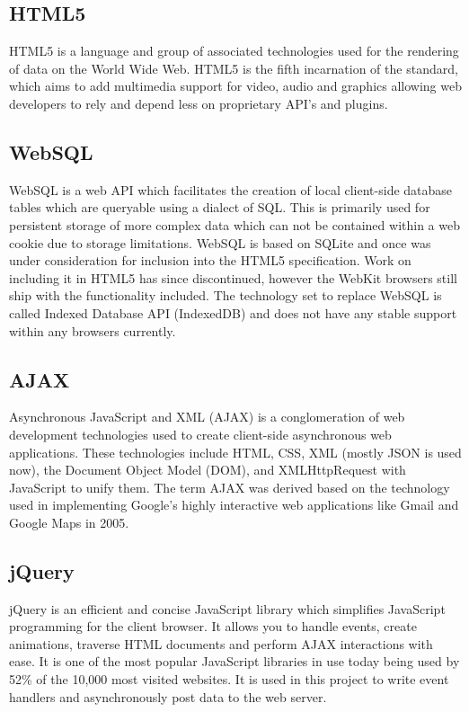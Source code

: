 \documentclass[12pt]{report}	%
\theoremstyle{definition}
\theoremstyle{remark}
\begin{document}
\subsection{HTML5}

HTML5 is a language and group of associated technologies used for the
rendering of data on the World Wide Web. HTML5 is the fifth incarnation
of the standard, which aims to add multimedia support for video, audio
and graphics allowing web developers to rely and depend less on
proprietary API's and plugins.

\subsection{WebSQL}

WebSQL is a web API which facilitates the creation of local client-side
database tables which are queryable using a dialect of SQL. This is
primarily used for persistent storage of more complex data which can not
be contained within a web cookie due to storage limitations. WebSQL is
based on SQLite and once was under consideration for inclusion into the
HTML5 specification. Work on including it in HTML5 has since
discontinued, however the WebKit browsers still ship with the
functionality included. The technology set to replace WebSQL is called
Indexed Database API (IndexedDB) and does not have any stable support
within any browsers currently.

\subsection{AJAX}

Asynchronous JavaScript and XML (AJAX) is a conglomeration of web
development technologies used to create client-side asynchronous web
applications. These technologies include HTML, CSS, XML (mostly JSON is
used now), the Document Object Model (DOM), and XMLHttpRequest with
JavaScript to unify them. The term AJAX was derived based on the
technology used in implementing Google's highly interactive web
applications like Gmail and Google Maps in 2005.

\subsection{jQuery}

jQuery is an efficient and concise JavaScript library which simplifies
JavaScript programming for the client browser. It allows you to handle
events, create animations, traverse HTML documents and perform AJAX
interactions with ease. It is one of the most popular JavaScript
libraries in use today being used by 52\% of the 10,000 most visited
websites. It is used in this project to write event handlers and
asynchronously post data to the web server.
\end{document}

